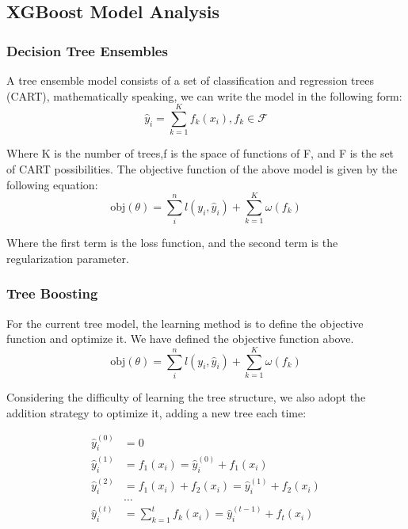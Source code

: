 \documentclass[12pt]{article}  %
\begin{document}
\subsection{XGBoost Model Analysis}
\subsubsection{Decision Tree Ensembles}
A tree ensemble model consists of a set of classification and regression trees (CART), mathematically speaking, we can write the model in the following form:
\begin{equation}
\hat{y}_i = \sum_{k=1}^K f_k(x_i), f_k \in \mathcal{F}
\end{equation}

Where K is the number of trees,f is the space of functions of F, and F is the set of CART possibilities. The objective function of the above model is given by the following equation:
\begin{equation}
\text{obj}(\theta) = \sum_i^n l(y_i, \hat{y}_i) + \sum_{k=1}^K \omega(f_k)
\end{equation}

Where the first term is the loss function, and the second term is the regularization parameter.
\subsubsection{Tree Boosting}
For the current tree model, the learning method is to define the objective function and optimize it. We have defined the objective function above.
\begin{equation}
\text{obj}(\theta) = \sum_i^n l(y_i, \hat{y}_i) + \sum_{k=1}^K \omega(f_k)
\end{equation}

Considering the difficulty of learning the tree structure, we also adopt the addition strategy to optimize it, adding a new tree each time:

\begin{equation}
\begin{split}\hat{y}_i^{(0)} &= 0\\
\hat{y}_i^{(1)} &= f_1(x_i) = \hat{y}_i^{(0)} + f_1(x_i)\\
\hat{y}_i^{(2)} &= f_1(x_i) + f_2(x_i)= \hat{y}_i^{(1)} + f_2(x_i)\\
&\dots\\
\hat{y}_i^{(t)} &= \sum_{k=1}^t f_k(x_i)= \hat{y}_i^{(t-1)} + f_t(x_i)\end{split}
\end{equation}
\end{document}
